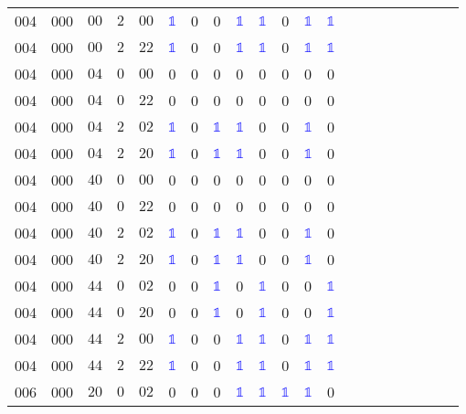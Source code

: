 \begin{longtable*}{c| cccccccccccccccccccc }
004& 000& $00$& $2$& $00$& \textcolor{blue}{$\mathds{1}$}& 0& 0& \textcolor{blue}{$\mathds{1}$}& \textcolor{blue}{$\mathds{1}$}& 0& \textcolor{blue}{$\mathds{1}$}& \textcolor{blue}{$\mathds{1}$}\\
004& 000& $00$& $2$& $22$& \textcolor{blue}{$\mathds{1}$}& 0& 0& \textcolor{blue}{$\mathds{1}$}& \textcolor{blue}{$\mathds{1}$}& 0& \textcolor{blue}{$\mathds{1}$}& \textcolor{blue}{$\mathds{1}$}\\
004& 000& $04$& $0$& $00$& 0& 0& 0& 0& 0& 0& 0& 0\\
004& 000& $04$& $0$& $22$& 0& 0& 0& 0& 0& 0& 0& 0\\
004& 000& $04$& $2$& $02$& \textcolor{blue}{$\mathds{1}$}& 0& \textcolor{blue}{$\mathds{1}$}& \textcolor{blue}{$\mathds{1}$}& 0& 0& \textcolor{blue}{$\mathds{1}$}& 0\\
004& 000& $04$& $2$& $20$& \textcolor{blue}{$\mathds{1}$}& 0& \textcolor{blue}{$\mathds{1}$}& \textcolor{blue}{$\mathds{1}$}& 0& 0& \textcolor{blue}{$\mathds{1}$}& 0\\
004& 000& $40$& $0$& $00$& 0& 0& 0& 0& 0& 0& 0& 0\\
004& 000& $40$& $0$& $22$& 0& 0& 0& 0& 0& 0& 0& 0\\
004& 000& $40$& $2$& $02$& \textcolor{blue}{$\mathds{1}$}& 0& \textcolor{blue}{$\mathds{1}$}& \textcolor{blue}{$\mathds{1}$}& 0& 0& \textcolor{blue}{$\mathds{1}$}& 0\\
004& 000& $40$& $2$& $20$& \textcolor{blue}{$\mathds{1}$}& 0& \textcolor{blue}{$\mathds{1}$}& \textcolor{blue}{$\mathds{1}$}& 0& 0& \textcolor{blue}{$\mathds{1}$}& 0\\
004& 000& $44$& $0$& $02$& 0& 0& \textcolor{blue}{$\mathds{1}$}& 0& \textcolor{blue}{$\mathds{1}$}& 0& 0& \textcolor{blue}{$\mathds{1}$}\\
004& 000& $44$& $0$& $20$& 0& 0& \textcolor{blue}{$\mathds{1}$}& 0& \textcolor{blue}{$\mathds{1}$}& 0& 0& \textcolor{blue}{$\mathds{1}$}\\
004& 000& $44$& $2$& $00$& \textcolor{blue}{$\mathds{1}$}& 0& 0& \textcolor{blue}{$\mathds{1}$}& \textcolor{blue}{$\mathds{1}$}& 0& \textcolor{blue}{$\mathds{1}$}& \textcolor{blue}{$\mathds{1}$}\\
004& 000& $44$& $2$& $22$& \textcolor{blue}{$\mathds{1}$}& 0& 0& \textcolor{blue}{$\mathds{1}$}& \textcolor{blue}{$\mathds{1}$}& 0& \textcolor{blue}{$\mathds{1}$}& \textcolor{blue}{$\mathds{1}$}\\
006& 000& $20$& $0$& $02$& 0& 0& 0& \textcolor{blue}{$\mathds{1}$}& \textcolor{blue}{$\mathds{1}$}& \textcolor{blue}{$\mathds{1}$}& \textcolor{blue}{$\mathds{1}$}& 0\\

\end{longtable*}
